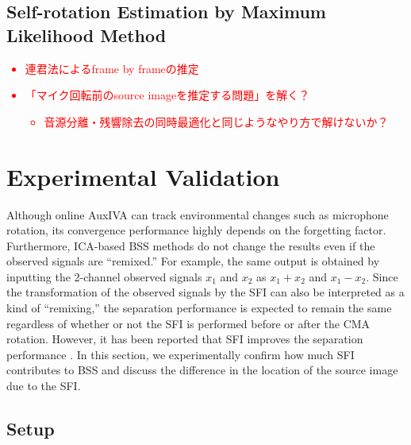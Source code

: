 \documentclass[sip,biber]{now-journal}
\newcommand{\todo}[1]{\textcolor{red}{#1}}
\begin{document}
\subsection{Self-rotation Estimation by Maximum Likelihood Method}

\todo{%
  \begin{itemize}
    \item 連君法によるframe by frameの推定
    \item 「マイク回転前のsource imageを推定する問題」を解く？
      \begin{itemize}
        \item 音源分離・残響除去の同時最適化と同じようなやり方で解けないか？
      \end{itemize}
  \end{itemize}
}

\section{Experimental Validation}\label{sec:experiment}

Although online AuxIVA can track environmental changes such as microphone rotation, its convergence performance highly depends on the forgetting factor.
Furthermore, ICA-based BSS methods do not change the results even if the observed signals are ``remixed.''
For example, the same output is obtained by inputting the 2-channel observed signals $x_1$ and $x_2$ as $x_1 + x_2$ and $x_1 - x_2$.
Since the transformation of the observed signals by the SFI can also be interpreted as a kind of ``remixing,''
the separation performance is expected to remain the same regardless of whether or not the SFI is performed before or after the CMA rotation.
However, it has been reported that SFI improves the separation performance \cite{Nakashima:2022:ASJ:A}.
In this section, we experimentally confirm how much SFI contributes to BSS and discuss the difference in the location of the source image due to the SFI.

\subsection{Setup}
\end{document}
